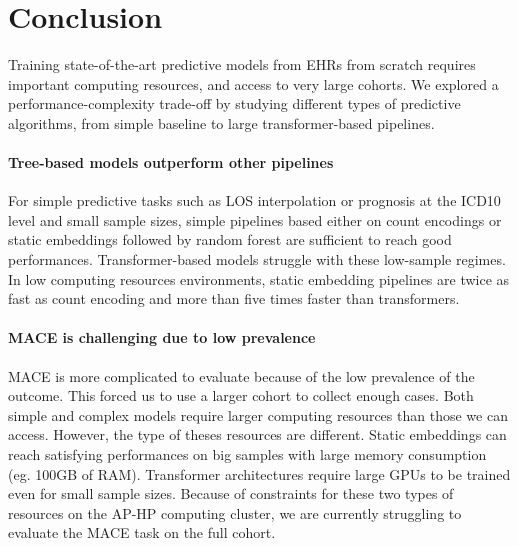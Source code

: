 \documentclass[french,12pt,twoside,a4paper]{book}
\begin{document}


\section{Conclusion}\label{sec:predictive_models:conclusion}

Training state-of-the-art predictive models from EHRs from scratch requires
important computing resources, and access to very large cohorts. We explored a
performance-complexity trade-off by studying different types of predictive
algorithms, from simple baseline to large transformer-based pipelines.

\paragraph{Tree-based models outperform other pipelines}
For simple predictive tasks such as LOS interpolation or prognosis at the ICD10 level and
small sample sizes, simple pipelines based either on count encodings or static
embeddings followed by random forest are sufficient to reach good performances.
Transformer-based models struggle with these low-sample regimes. In low
computing resources environments, static embedding pipelines are twice as fast
as count encoding and more than five times faster than transformers.


\paragraph{MACE is challenging due to low prevalence}
MACE is more complicated to evaluate because of the low prevalence of the
outcome. This forced us to use a larger cohort to collect enough cases. Both
simple and complex models require larger computing resources than those we can
access. However, the type of theses resources are different. Static embeddings
can reach satisfying performances on big samples with large memory consumption
(eg. 100GB of RAM). Transformer architectures require large GPUs to be trained
even for small sample sizes. Because of constraints for these two types of
resources on the AP-HP computing cluster, we are currently struggling to
evaluate the MACE task on the full cohort.
\end{document}
